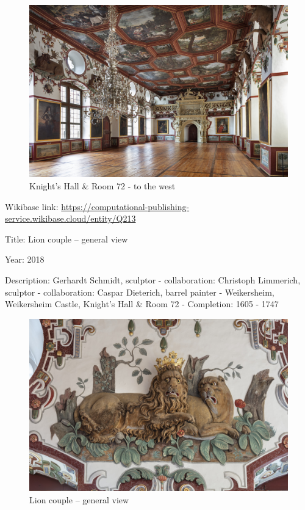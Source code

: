\documentclass[
  letterpaper,
]{book}
\begin{document}
\begin{figure}[H]

{\centering \includegraphics{impressum_files/mediabag/fmd10005862a.jpg}

}

\caption{Knight's Hall \& Room 72 - to the west}

\end{figure}%

Wikibase link:
\url{https://computational-publishing-service.wikibase.cloud/entity/Q213}

Title: Lion couple -- general view

Year: 2018

Description: Gerhardt Schmidt, sculptor - collaboration: Christoph
Limmerich, sculptor - collaboration: Caspar Dieterich, barrel painter -
Weikersheim, Weikersheim Castle, Knight's Hall \& Room 72 - Completion:
1605 - 1747

\begin{figure}[H]

{\centering \includegraphics{impressum_files/mediabag/fmd10005864a.jpg}

}

\caption{Lion couple -- general view}

\end{figure}%
\end{document}
